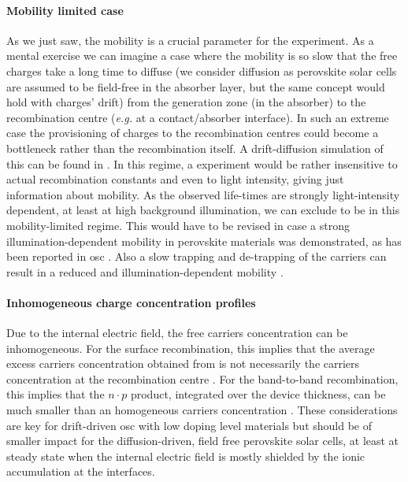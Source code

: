 		\paragraph{Mobility limited case}\label{tpv_mobility}
		As we just saw, the mobility is a crucial parameter for the  experiment.
		As a mental exercise we can imagine a case where the mobility is so slow that the free charges take a long time to diffuse (we consider diffusion as perovskite solar cells are assumed to be field\hyp{}free in the absorber layer, but the same concept would hold with charges' drift) from the generation zone (in the absorber) to the recombination centre (\textsl{e.g.} at a contact/absorber interface).
		In such an extreme case the provisioning of charges to the recombination centres could become a bottleneck rather than the recombination itself.
		A drift\hyp{}diffusion simulation of this can be found in .
		In this regime, a  experiment would be rather insensitive to actual recombination constants and even to light intensity, giving just information about mobility.
		As the observed  life\hyp{}times are strongly light\hyp{}intensity dependent, at least at high background illumination, we can exclude to be in this mobility\hyp{}limited regime.
		This would have to be revised in case a strong illumination\hyp{}dependent mobility in perovskite materials was demonstrated, as has been reported in \gls{osc} \cite{Eng2010,Shuttle2010,Deledalle2014}.
		Also a slow trapping and de\hyp{}trapping of the carriers can result in a reduced and illumination\hyp{}dependent mobility \cite{Du2018}.

		\paragraph{Inhomogeneous charge concentration profiles}
		Due to the internal electric field, the free carriers concentration can be inhomogeneous.
		For the surface recombination, this implies that the average excess carriers concentration obtained from  is not necessarily the carriers concentration at the recombination centre \cite{Kirchartz2012}.
		For the band\hyp{}to\hyp{}band recombination, this implies that the $n \cdot p$ product, integrated over the device thickness, can be much smaller than an homogeneous carriers concentration \cite{Deibel2009}.
		These considerations are key for drift\hyp{}driven \gls{osc} with low doping level materials \cite{Deledalle2015,Deledalle2014} but should be of smaller impact for the diffusion\hyp{}driven, field free perovskite solar cells, at least at steady state when the internal electric field is mostly shielded by the ionic accumulation at the interfaces.

